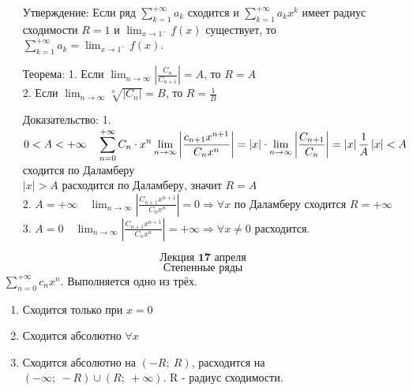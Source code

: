 \documentclass[12pt, letterpaper, twoside]{article}
\newcommand{\DS}{\displaystyle}
\newcommand{\oo}{\infty}
\newcommand{\Abs}[1]{\left| #1 \right|}
\begin{document}
\begin{enumerate}
        \item[Утверждение:] Если ряд $\DS\sum_{k =1}^{+\oo} a_k$ сходится и $\DS \sum_{k =1}^{+\oo} a_kx^k$ имеет радиус сходимости $R = 1$ и $\DS\lim_{x \rightarrow 1^-} f(x)$ существует, то 
        $\DS\sum_{k = 1}^{+\oo} a_k = \lim_{x \rightarrow 1^-} f(x)$.
        \item[Теорема:] 1. Если $\DS \lim_{n \rightarrow \oo} \Abs{\frac{C_n}{C_{n + 1}}} = A$, то $R = A$\\
        2. Если $\DS \lim_{n\rightarrow \oo} \sqrt[n]{\Abs{C_n}} = B$, то $R = \frac{1}{B}$
        \item[Доказательство:] 1. $\DS0 < A < +\oo\quad \sum_{n = 0}^{+\oo}C_n\cdot x^n\\
        \lim_{n \rightarrow \oo} \Abs{\frac{c_{n + 1}x^{n + 1}}{C_n x^n}} = \Abs{x}\cdot \lim_{n\rightarrow \oo}\Abs{\frac{C_{n + 1}}{C_n}} = \Abs{x}\frac{1}{A}\\
        \Abs{x} < A$ сходится по Даламберу\\
        $\DS \Abs{x} > A$ расходится по Даламберу, значит $R = A$\\
        2. $A = +\oo\quad \DS \lim_{n\rightarrow \oo} \Abs{\frac{C_{n + 1}x^{n + 1}}{C_n x^n}} = 0\Rightarrow \forall x$ по Даламберу сходится $R = +\oo$\\
        3. $A = 0\quad \DS \lim_{n \rightarrow \oo} \Abs{\frac{C_{n + 1}x^{n + 1}}{C_n x^n}} = +\oo\Rightarrow \forall x\neq 0$ расходится.
    \end{enumerate} 
    \[\textbf{Лекция 17 апреля}\] 
    \[\text{Степенные ряды}\]
    $\DS \sum_{n = 0}^{+\oo}c_n x^n$. Выполняется одно из трёх.\\
    \begin{enumerate}
        \item Сходится только при $x = 0$
        \item Сходится абсолютно $\forall x$
        \item Сходится абсолютно на $(-R;\ R)$, расходится на $(-\oo;\ -R)\cup (R;\ +\oo)$. R - радиус сходимости.
    \end{enumerate}
\end{document}
